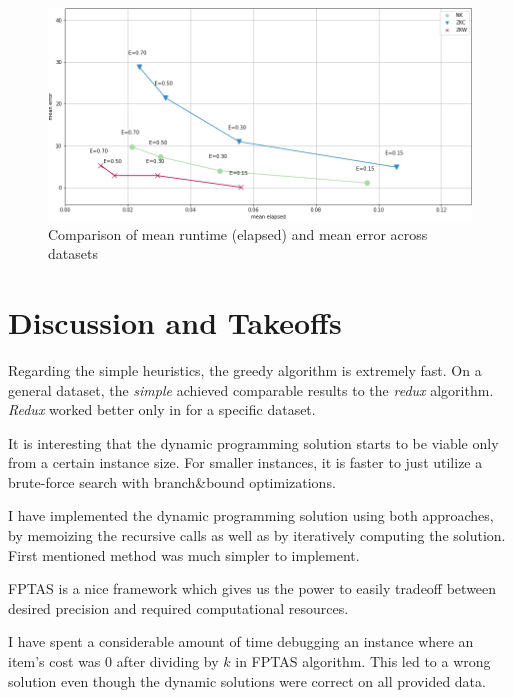 \documentclass[a4paper,10pt]{article}
\begin{document}
\begin{figure}[!htb]
	\centering
  	\includegraphics[width=\textwidth]{images/fptas_comparison.png}
	\caption{Comparison of mean runtime (elapsed) and mean error across datasets}
	\label{fptas_comparison}
\end{figure}


\section{Discussion and Takeoffs}
Regarding the simple heuristics, the greedy algorithm is extremely fast. On a general dataset, the \emph{simple} achieved comparable results to the \emph{redux} algorithm. \emph{Redux} worked better only in for a specific dataset.

It is interesting that the dynamic programming solution starts to be viable only from a certain instance size. For smaller instances, it is faster to just utilize a brute-force search with branch\&bound optimizations.

I have implemented the dynamic programming solution using both approaches, by memoizing the recursive calls as well as by iteratively computing the solution. First mentioned method was much simpler to implement.

FPTAS is a nice framework which gives us the power to easily tradeoff between desired precision and required computational resources.

I have spent a considerable amount of time debugging an instance where an item's cost was $0$ after dividing by $k$ in FPTAS algorithm. This led to a wrong solution even though the dynamic solutions were correct on all provided data.
\end{document}
